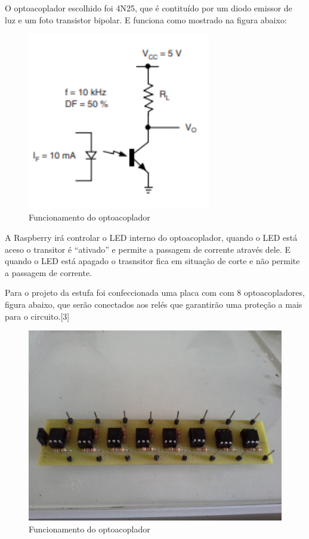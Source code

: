 O optoacoplador escolhido foi 4N25, que é contituído por um diodo emissor de luz e um foto transistor bipolar. E funciona como mostrado na figura abaixo:

\begin{figure}[H]
	\centering
	\includegraphics[width=8cm]{figuras/optocoaplador.png}
	\caption{Funcionamento do optoacoplador} \label{optocoaplador}
\end{figure}

A Raspberry irá controlar o LED interno do optoacoplador, quando o LED está aceso o transitor é “ativado” e permite a passagem de corrente através dele. E quando o LED está apagado o trasnsitor fica em situação de corte e não permite a passagem de corrente.

Para o projeto da estufa foi confeccionada uma placa com com 8 optoacopladores, figura abaixo, que serão conectados aos relés que garantirão uma proteção a mais para o circuito.[3]

\begin{figure}[H]
	\centering
	\includegraphics[width=15cm]{figuras/optoacopladores.jpg}
	\caption{Funcionamento do optoacoplador} \label{optoacopladores}
\end{figure}

